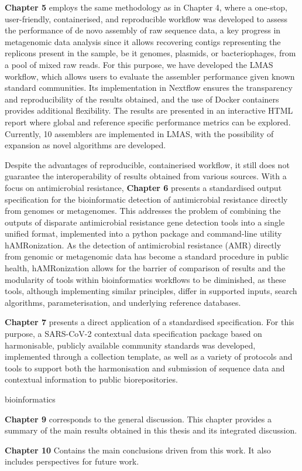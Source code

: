 \textbf{Chapter 5} employs the same methodology as in Chapter 4, where a one-stop, user-friendly, containerised, and reproducible workflow was developed to assess the performance of de novo assembly of raw sequence data, a key progress in metagenomic data analysis since it allows recovering contigs representing the replicons present in the sample, be it genomes, plasmids, or bacteriophages, from a pool of mixed raw reads. For this purpose, we have developed the LMAS workflow, which allows users to evaluate the assembler performance given known standard communities. Its implementation in Nextflow ensures the transparency and reproducibility of the results obtained, and the use of Docker containers provides additional flexibility. The results are presented in an interactive HTML report where global and reference specific performance metrics can be explored. Currently, 10 assemblers are implemented in LMAS, with the possibility of expansion as novel algorithms are developed.


Despite the advantages of reproducible, containerised workflow, it still does not guarantee the interoperability of results obtained from various sources. With a focus on antimicrobial resistance, \textbf{Chapter 6} presents a standardised output specification for the bioinformatic detection of antimicrobial resistance directly from genomes or metagenomes. This addresses the problem of combining the outputs of disparate antimicrobial resistance gene detection tools into a single unified format, implemented into a python package and command-line utility hAMRonization. As the detection of antimicrobial resistance (AMR) directly from genomic or metagenomic data has become a standard procedure in public health, hAMRonization allows for the barrier of comparison of results and the modularity of tools within bioinformatics workflows to be diminished, as these tools, although implementing similar principles, differ in supported inputs, search algorithms, parameterisation, and underlying reference databases. 


\textbf{Chapter 7} presents a direct application of a standardised specification. For this purpose, a SARS-CoV-2 contextual data specification package based on harmonisable, publicly available community standards was developed, implemented through a collection template, as well as a variety of protocols and tools to support both the harmonisation and submission of sequence data and contextual information to public biorepositories. 

bioinformatics 

\textbf{Chapter 9} corresponds to the general discussion. This chapter provides a summary of the main results obtained in this thesis and its integrated discussion. 

\textbf{Chapter 10} Contains the main conclusions driven from this work. It also includes perspectives for future work. 